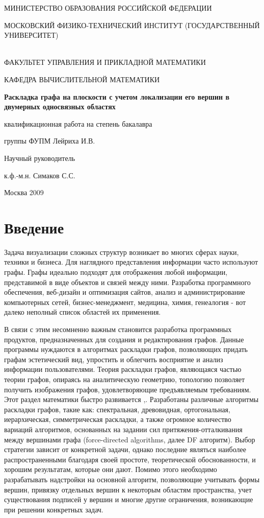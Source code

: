 \documentclass[a4paper,12pt]{report}
\renewcommand{\maketitle}{
\begin{titlepage}
	\begin{center}
           	МИНИСТЕРСТВО ОБРАЗОВАНИЯ РОССИЙСКОЙ ФЕДЕРАЦИИ\par
		МОСКОВСКИЙ ФИЗИКО-ТЕХНИЧЕСКИЙ ИНСТИТУТ (ГОСУДАРСТВЕННЫЙ УНИВЕРСИТЕТ)\par
		\hrulefill\\
		ФАКУЛЬТЕТ УПРАВЛЕНИЯ И ПРИКЛАДНОЙ МАТЕМАТИКИ\par
		КАФЕДРА ВЫЧИСЛИТЕЛЬНОЙ МАТЕМАТИКИ\par
		\vspace{60mm}
	{\LARGE \bf{Раскладка графа на плоскости с учетом локализации его вершин в двумерных односвязных областях}}\par
		\vspace{20mm}
		{\LargeВыпускная квалификационная работа на степень бакалавра}\par
		{\Largeстудента 571 группы ФУПМ Лейриха И.В.}\par
	\end{center}

	\vfill
        \hfill
        \begin{minipage}[t]{80mm}\flushleft

            Научный руководитель \par
            к.ф.-м.н. Симаков С.С.\par

        \end{minipage}
        \vspace{10mm}
        \vfill



	\begin{center}
		Москва 2009
	\end{center}

\end{titlepage}
\stepcounter{page}
}
\begin{document}
\maketitle
\tableofcontents

\chapter*{Введение}

Задача визуализации сложных структур возникает во многих сферах науки, техники и бизнеса. Для наглядного представления информации часто используют графы. Графы идеально подходят для отображения любой информации, представимой в виде объектов и связей между ними.  Разработка программного обеспечения, веб-дизайн и оптимизация сайтов, анализ и администрирование компьютерных сетей, бизнес-менеджмент,  медицина, химия, генеалогия - вот далеко неполный список областей их применения.

В связи с этим несомненно важным становится разработка программных продуктов, предназначенных для создания и редактирования графов. Данные программы нуждаются  в алгоритмах раскладки графов, позволяющих придать графам эстетический вид,  упростить и облегчить восприятие и анализ информации пользователями. Теория раскладки графов, являющаяся частью теории графов, опираясь на аналитическую геометрию, топологию позволяет получить изображения графов, удовлетворяющие предъявляемым требованиям. Этот раздел математики быстро развивается \cite{graphdrawing},\cite{gdea}. Разработаны различные алгоритмы раскладки графов, такие как: спектральная, древовидная, ортогональная, иерархическая, симметрическая раскладки, а также огромное количество вариаций алгоритмов, основанных на задании сил притяжения-отталкивания между вершинами графа (force-directed algorithms, далее DF алгоритм). Выбор стратегии зависит от конкретной задачи, однако последние являться наиболее распространенными благодаря своей простоте, теоретической обоснованности, и хорошим результатам, которые они дают. Помимо этого необходимо разрабатывать надстройки на основной алгоритм, позволяющие учитывать формы вершин, привязку отдельных вершин к некоторым областям пространства, учет существования подписей у вершин и многие другие ограничения, возникающие при решении конкретных задач. 
\end{document}
